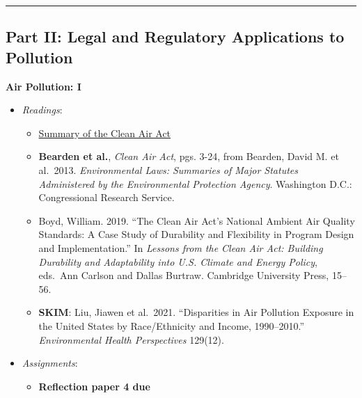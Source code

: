 \begin{center}\rule{0.5\linewidth}{0.5pt}\end{center}

\hypertarget{part-ii-legal-and-regulatory-applications-to-pollution}{%
\subsection{Part II: Legal and Regulatory Applications to
Pollution}\label{part-ii-legal-and-regulatory-applications-to-pollution}}

\week \textbf{Air Pollution: I}

\begin{itemize}

\item
  \emph{Readings}:

  \begin{itemize}
  
  \item
    \href{https://www.epa.gov/laws-regulations/summary-clean-air-act}{Summary
    of the Clean Air Act}
  \item
    \textbf{Bearden et al.}, \emph{Clean Air Act}, pgs. 3-24, from
    Bearden, David M. et al.~2013. \emph{Environmental Laws: Summaries
    of Major Statutes Administered by the Environmental Protection
    Agency}. Washington D.C.: Congressional Research Service.
  \item
    Boyd, William. 2019. ``The Clean Air Act's National Ambient Air
    Quality Standards: A Case Study of Durability and Flexibility in
    Program Design and Implementation.'' In \emph{Lessons from the Clean
    Air Act: Building Durability and Adaptability into U.S. Climate and
    Energy Policy}, eds.~Ann Carlson and Dallas Burtraw. Cambridge
    University Press, 15--56.
  \item
    \textbf{SKIM}: Liu, Jiawen et al.~2021. ``Disparities in Air
    Pollution Exposure in the United States by Race/Ethnicity and
    Income, 1990--2010.'' \emph{Environmental Health Perspectives}
    129(12).
  \end{itemize}
\item
  \emph{Assignments}:

  \begin{itemize}
  
  \item
    \textbf{Reflection paper 4 due}
  \end{itemize}
\end{itemize}

